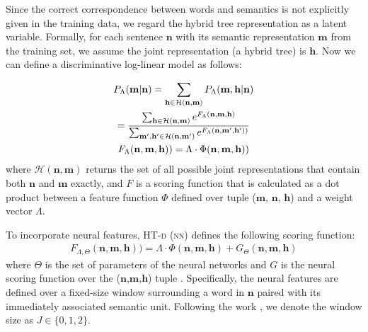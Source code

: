 \documentclass[11pt,a4paper]{article}
\begin{document}
{Since the correct correspondence between words and semantics is not explicitly given in the training data, we regard the hybrid tree representation as a latent variable.
Formally, for each sentence $\mathbf{n}$ with its semantic representation $\mathbf{m}$ from the training set, we assume the joint representation (a hybrid tree) is $\mathbf{h}$.
Now we can define a discriminative log-linear model as follows:
{\begin{gather}
\small
P_{\Lambda}(\mathbf{m}|\mathbf{n}) =\sum_{\mathbf{h} \in \mathcal{H}{(\mathbf{n},\mathbf{m})}} P_{\Lambda}(\mathbf{m},\mathbf{h}|\mathbf{n})   \notag \\
=\frac{\sum_{\mathbf{h} \in \mathcal{H}{(\mathbf{n},\mathbf{m})}} e^{F_{\Lambda}(\mathbf{n},\mathbf{m},\mathbf{h})}}{\sum_{\mathbf{m}',\mathbf{h}'\in \mathcal{H}(\mathbf{n},\mathbf{m}')}e^{F_{\Lambda}(\mathbf{n},\mathbf{m}',\mathbf{h}'))}}
\\
F_{\Lambda}(\mathbf{n},\mathbf{m},\mathbf{h})) = \Lambda\cdot\Phi{(\mathbf{n},\mathbf{m},\mathbf{h}))}
\label{partition}
\end{gather}
where $\mathcal{H}(\mathbf{n},\mathbf{m})$ returns the set of all possible joint representations that contain both $\mathbf{n}$ and $\mathbf{m}$ exactly, and $F$ is a scoring function that is calculated as a dot product between a feature function $\Phi$ defined over tuple ($\mathbf{m}$, $\mathbf{n}$, $\mathbf{h}$) and a  weight vector $\Lambda$. 


To incorporate neural features, {\textsc{HT-d} \textsc{(nn)}} defines the following scoring function:
\begin{gather}
F_{\Lambda, \Theta}(\mathbf{n},\mathbf{m},\mathbf{h})) = \Lambda\cdot\Phi{(\mathbf{n},\mathbf{m},\mathbf{h})} + G_{\Theta}(\mathbf{n},\mathbf{m},\mathbf{h})
\label{scof1}
\end{gather} 
where $\Theta$ is the set of parameters of the neural networks and $G$ is the neural scoring function over the ($\mathbf{n}$,$\mathbf{m}$,$\mathbf{h}$) tuple \cite{Rhs:17}.
Specifically, the neural features are defined over a fixed-size window surrounding a word in $\mathbf{n}$ paired with its immediately associated semantic unit. 
Following the work \cite{Rhs:17}, we denote the window size as $J\in\{0,1,2\}$.

}}
\end{document}
